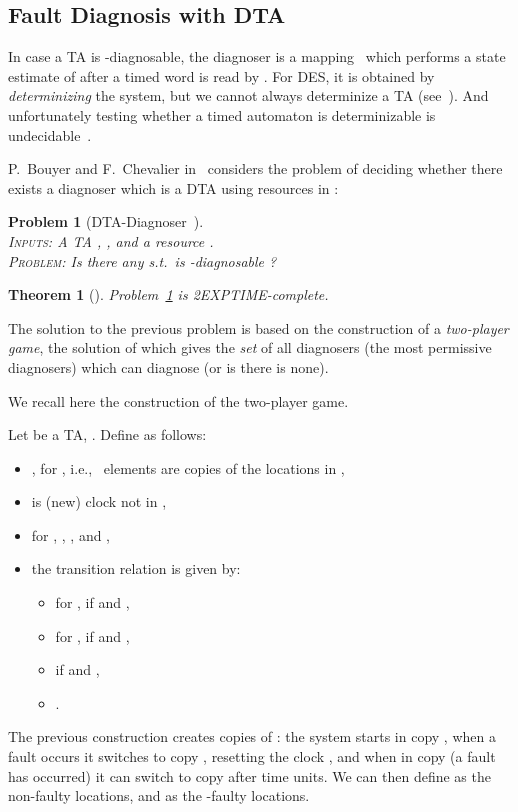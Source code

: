 \documentclass[letterpaper,10pt,conference]{ieeeconf}  \IEEEoverridecommandlockouts                              \overrideIEEEmargins
\def\ie{{i.e.},~}
\def\st{{s.t.}~}
\newtheorem{prob}{Problem}  \newtheorem{definition}{Definition}
\newtheorem{theorem}{Theorem}
\def\dtamu{DTA\xspace}
\begin{document}
\subsection{Fault Diagnosis with DTA~\cite{Bouyerfossacs05}}\label{sec-algo}
In case a TA  is -diagnosable, the diagnoser is a
mapping~\cite{tripakis-02} which performs a state estimate of 
after a timed word  is read by .  For DES, it is obtained by
\emph{determinizing} the system, but we cannot always determinize a TA
 (see~\cite{AlurDill94}).  And unfortunately testing whether a
timed automaton is determinizable is
undecidable~\cite{Finkel05,TripakisFolk}.


P.~Bouyer and F.~Chevalier in~\cite{Bouyerfossacs05} considers the
problem of deciding whether there exists a diagnoser which is a DTA
using resources in :

\begin{prob}[\dtamu -Diagnoser~\cite{Bouyerfossacs05}] \label{prob-dtamu} \mbox{} \\
  \textsc{Inputs:} A TA ,
  ,
  and a resource .\\
  \textsc{Problem:} Is there any  \st  is
  -dia\-gnosable ?
\end{prob}
\begin{theorem}[\cite{Bouyerfossacs05}]
Problem~\ref{prob-dtamu}  is 2EXPTIME-complete.
\end{theorem}

The solution to the previous problem is based on the construction of a
\emph{two-player game}, the solution of which gives the \emph{set} of
all  diagnosers (the most permissive diagnosers) which
can diagnose  (or  is there is none).

We recall here the construction of the two-player game.

Let  be a TA, .  Define  as follows:
\begin{itemize}
\item , for , \ie 
  elements are copies of the locations in ,
\item  is (new) clock not in ,
\item for , ,
  , and 
  ,
\item the transition relation is given by:
  \begin{itemize}
  \item for ,  if  and ,
  \item for ,  if  and ,
  \item  if  and ,
  \item .
  \end{itemize}
\end{itemize}
The previous construction creates  copies of : the system starts
in copy , when a fault occurs it switches to copy , resetting
the clock , and when in copy  (a fault has occurred) it can
switch to copy  after  time units.  We can then define
 as the non-faulty locations, and  as the -faulty
locations.
\end{document}
